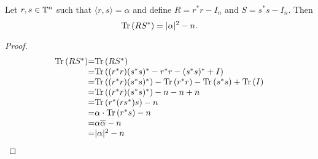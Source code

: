 \begin{lemma} \label{lem:rs_trace}
 Let $r,s \in \mathbb{T}^n$ such that $\langle r,s \rangle = \alpha$ and define $R = r^*r - I_n$ and $S = s^*s - I_n$. Then $$\text{Tr}\left(RS^*\right) = |\alpha|^2 - n.$$
 \begin{proof}
  $$\begin{array}{r@{=}l}
     \tr\left(RS^*\right) & \tr\left(RS^*\right) \\
                          & \tr\left((r^*r)(s^*s)^*-r^*r-(s^*s)^*+I\right) \\
                          & \tr\left((r^*r)(s^*s)^*\right) - \tr\left(r^*r\right) - \tr\left(s^*s\right) + \tr\left(I\right) \\
                          & \tr\left((r^*r)(s^*s)^*\right) - n - n + n \\
                          & \tr\left(r^*(rs^*)s\right) - n \\
                          & \alpha\cdot\tr\left(r^*s\right) - n \\
                          & \alpha\overline{\alpha} - n \\
                          & |\alpha|^2 - n
    \end{array}
  $$
 \end{proof}
\end{lemma}

